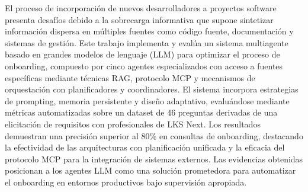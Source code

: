 El proceso de incorporación de nuevos desarrolladores a proyectos software presenta desafíos debido a la sobrecarga informativa que supone sintetizar información dispersa en múltiples fuentes como código fuente, documentación y sistemas de gestión. Este trabajo implementa y evalúa un sistema multiagente basado en grandes modelos de lenguaje (LLM) para optimizar el proceso de onboarding, compuesto por cinco agentes especializados con acceso a fuentes específicas mediante técnicas RAG, protocolo MCP y mecanismos de orquestación con planificadores y coordinadores. El sistema incorpora estrategias de prompting, memoria persistente y diseño adaptativo, evaluándose mediante métricas automatizadas sobre un dataset de 46 preguntas derivadas de una elicitación de requisitos con profesionales de LKS Next. Los resultados demuestran una precisión superior al 80\% en consultas de onboarding, destacando la efectividad de las arquitecturas con planificación unificada y la eficacia del protocolo MCP para la integración de sistemas externos. Las evidencias obtenidas posicionan a los agentes LLM como una solución prometedora para automatizar el onboarding en entornos productivos bajo supervisión apropiada.

